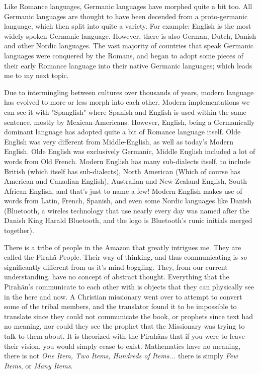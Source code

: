 \documentclass[12pt]{article}
\begin{document}
\par
Like Romance languages, Germanic languages have morphed quite a bit too. All Germanic languages are thought to have been decended from a proto-germanic language, which then split into quite a variety. For example: English is the most widely spoken Germanic language. However, there is also German, Dutch, Danish and other Nordic languages. The vast majority of countries that speak Germanic languages were conquered by the Romans, and began to adopt some pieces of their early Romance language into their native Germanic languages; which leads me to my next topic.
\par
Due to intermingling between cultures over thousands of years, modern language has evolved to more or less morph into each other. Modern implementations we can see it with "Spanglish" where Spanish and English is used within the same sentence, mostly by Mexican-Americans. However, English, being a Germanically dominant language has adopted quite a bit of Romance language itself. Olde English was very different from Middle-English, as well as today's Modern English. Olde English was exclusively Germanic, Middle English included a lot of words from Old French. Modern English has many sub-dialects itself, to include British (which itself has sub-dialects), North American (Which of course has American and Canadian English), Australian and New Zealand English, South African English, and that's just to name a few! Modern English makes use of words from Latin, French, Spanish, and even some Nordic languages like Danish (Bluetooth, a wireles technology that use nearly every day was named after the Danish King Harald Bluetooth, and the logo is Bluetooth's runic initials merged together).
\par
There is a tribe of people in the Amazon that greatly intrigues me. They are called the Pirah\~{a} People. Their way of thinking, and thus communicating is \emph{so} significantly different from us it's mind boggling. They, from our current understanding, have no concept of abstract thought. Everything that the Pirah\~{a}n's communicate to each other with is objects that they can physically see in the here and now. A Christian missionary went over to attempt to convert some of the tribal members, and the translator found it to be impossible to translate since they could not communicate the book, or prophets since text had no meaning, nor could they see the prophet that the Missionary was trying to talk to them about. It is theorized with the Pirah\~{a}ns that if you were to leave their vision, you would simply cease to exist. Mathematics have no meaning, there is not \emph{One Item, Two Items, Hundreds of Items...} there is simply \emph{Few Items}, or \emph{Many Items}.
\end{document}
